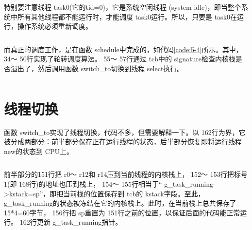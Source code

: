 \documentclass[main.tex]{subfiles}
\begin{document}
\begin{CJK*}{UTF8}{song}
\par
特别要注意线程 task0(它的tid=0)，它是系统空闲线程 (system idle)，即当整个系统中所有其他线程都不能运行时，才能调度 task0运行。所以，只要是 task0在运行，操作系统必须重新调度。

\begin{code}
\label{code:5-3}
\inputminted[firstline=8,lastline=31,linenos,numbersep=5pt,frame=lines,framesep=2mm]{c}{src/chapter05/kernel/timer.c}
\end{code}

而真正的调度工作，是在函数 schedule中完成的，如代码\ref{code:5-4}所示。其中， 34～ 50行实现了轮转调度算法。 55～ 57行通过 tcb中的 signature检查内核栈是否溢出了，然后调用函数 switch\_\-to切换到线程 select执行。

\begin{code}
\label{code:5-4}
\inputminted[firstline=29,lastline=61,linenos,numbersep=5pt,frame=lines,framesep=2mm]{c}{src/chapter05/kernel/task.c}
\end{code}

\section{线程切换}
函数 switch\_\-to实现了线程切换，代码不多，但需要解释一下。以 162行为界，它被分成两部分：前半部分保存正在运行线程的状态，后半部分恢复即将运行线程 new的状态到 CPU上。

\begin{code}
\label{code:5-5}
\inputminted[firstline=145,lastline=162,linenos,numbersep=5pt,frame=lines,framesep=2mm]{c}{src/chapter05/kernel/machdep.c}
\end{code}

前半部分的151行把 r0～ r12和 r14压到当前线程的内核栈上， 152～ 153行把标号1(即 168行)的地址也压到栈上， 154～ 155行相当于“ g\_\-task\_\-running-\textgreater kstack=sp”，即把当前栈的位置保存到 tcb的 kstack字段。至此， g\_\-task\_\-running的状态被冻结在它的内核栈上。此时，在当前栈上总共保存了 15*4=60字节， 156行把 sp重置为 151行之前的位置，以保证后面的代码能正常运行。 162行更新 g\_\-task\_\-running指针。

\begin{code}
\label{code:5-6}
\inputminted[firstline=162,lastline=174,linenos,numbersep=5pt,frame=lines,framesep=2mm]{c}{src/chapter05/kernel/machdep.c}
\end{code}


\end{CJK*}
\end{document}
